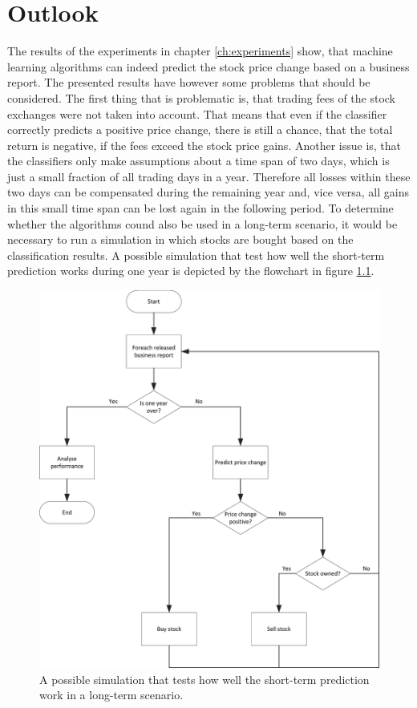 \chapter{Outlook}\label{ch:outlook}

The results of the experiments in chapter \ref{ch:experiments} show, that machine learning algorithms can indeed predict the stock price change based on a business report.
The presented results have however some problems that should be considered.
The first thing that is problematic is, that trading fees of the stock exchanges were not taken into account.
That means that even if the classifier correctly predicts a positive price change, there is still a chance, that the total return is negative, if the fees exceed the stock price gains.
Another issue is, that the classifiers only make assumptions about a time span of two days, which is just a small fraction of all trading days in a year.
Therefore all losses within these two days can be compensated during the remaining year and, vice versa, all gains in this small time span can be lost again in the following period.
To determine whether the algorithms cound also be used in a long-term scenario, it would be necessary to run a simulation in which stocks are bought based on the classification results.
A possible simulation that test how well the short-term prediction works during one year is depicted by the flowchart in figure \ref{figure:long_term_simulation}.
\begin{figure}[h]
    \centering
    \includegraphics[width=\textwidth]{figures/Simulation.png}
    \caption{A possible simulation that tests how well the short-term prediction work in a long-term scenario.}
    \label{figure:long_term_simulation}
\end{figure}

